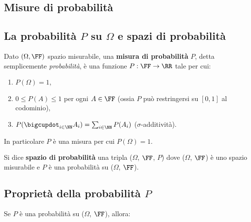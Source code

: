 \begin{multicols*}{2}
    \section{Misure di probabilità}

    \subsection{La probabilità \texorpdfstring{$P$}{P} su \texorpdfstring{$\Omega$}{Ω} e spazi di probabilità}

    \begin{definition}
        Dato $(\Omega, \FF)$ spazio misurabile, una \textbf{misura
        di probabilità} $P$, detta semplicemente \textit{probabilità},
        è una funzione $P : \FF \to \RR$ tale per cui:

        \begin{enumerate}[(i.)]
            \item $P(\Omega) = 1$,
            \item $0 \leq P(A) \leq 1$ per ogni $A \in \FF$ (ossia $P$ può restringersi su $[0, 1]$ al codominio),
            \item $P(\bigcupdot_{i \in \NN} A_i) = \sum_{i \in \NN} P(A_i)$ ($\sigma$-additività).
        \end{enumerate}

        In particolare $P$ è una misura per cui $P(\Omega) = 1$.
    \end{definition}

    \begin{definition}
        Si dice \textbf{spazio di probabilità} una tripla
        ($\Omega$, $\FF$, $P$) dove ($\Omega$, $\FF$) è
        uno spazio misurabile e $P$ è una
        probabilità su ($\Omega$, $\FF$).
    \end{definition}

    \subsection{Proprietà della probabilità \texorpdfstring{$P$}{P}}

    \begin{proposition}[Proprietà di $P$]
        Se $P$ è una probabilità su ($\Omega$, $\FF$), allora:


\end{proposition}
\end{multicols*}
